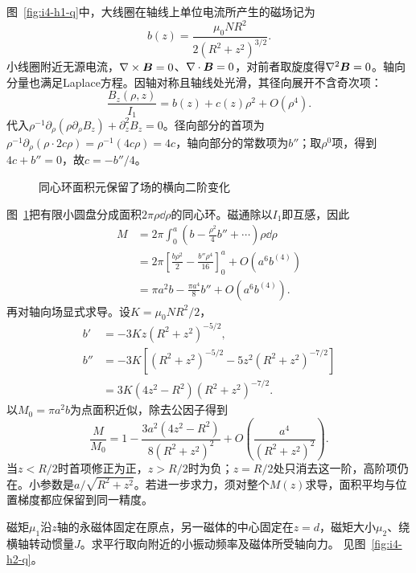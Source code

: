 \begin{solution}
图~\ref{fig:i4-h1-q}中，大线圈在轴线上单位电流所产生的磁场记为
\[
b(z)=\frac{\mu_0NR^2}{2(R^2+z^2)^{3/2}}.
\]
小线圈附近无源电流，$\nabla\times\bm{B}=0$、$\nabla\cdot\bm{B}=0$，对前者取旋度得$\nabla^2\bm{B}=0$。轴向分量也满足Laplace方程。因轴对称且轴线处光滑，其径向展开不含奇次项：
\[
\frac{B_z(\rho,z)}{I_1}=b(z)+c(z)\rho^2+O(\rho^4).
\]
代入$\rho^{-1}\partial_\rho(\rho\partial_\rho B_z)+\partial_z^2B_z=0$。径向部分的首项为$\rho^{-1}\partial_\rho(\rho\cdot2c\rho)=\rho^{-1}(4c\rho)=4c$，轴向部分的常数项为$b''$；取$\rho^0$项，得到$4c+b''=0$，故$c=-b''/4$。
\begin{figure}[H]\centering
{}
\caption{同心环面积元保留了场的横向二阶变化}\label{fig:i4-h1-s}
\end{figure}
图~\ref{fig:i4-h1-s}把有限小圆盘分成面积$2\pi\rho\dd\rho$的同心环。磁通除以$I_1$即互感，因此
\[
\begin{aligned}
M&=2\pi\int_0^a\left(b-\frac{\rho^2}{4}b''+\cdots\right)\rho\dd\rho\\
&=2\pi\left[\frac{b\rho^2}2-\frac{b''\rho^4}{16}\right]_0^a+O(a^6b^{(4)})\\
&=\pi a^2b-\frac{\pi a^4}{8}b''+O(a^6b^{(4)}).
\end{aligned}
\]
再对轴向场显式求导。设$K=\mu_0NR^2/2$，
\[\begin{aligned}
b'&=-3Kz(R^2+z^2)^{-5/2},\\
b''&=-3K\left[(R^2+z^2)^{-5/2}-5z^2(R^2+z^2)^{-7/2}\right]\\
&=3K(4z^2-R^2)(R^2+z^2)^{-7/2}.
\end{aligned}\]
以$M_0=\pi a^2b$为点面积近似，除去公因子得到
\[
\boxed{\frac{M}{M_0}=1-
\frac{3a^2(4z^2-R^2)}{8(R^2+z^2)^2}
+O\!\left(\frac{a^4}{(R^2+z^2)^2}\right)}.
\]
当$z<R/2$时首项修正为正，$z>R/2$时为负；$z=R/2$处只消去这一阶，高阶项仍在。小参数是$a/\sqrt{R^2+z^2}$。若进一步求力，须对整个$M(z)$求导，面积平均与位置梯度都应保留到同一精度。
\end{solution}

\begin{exercise}[轴向偶极场中的转动振动]\label{ex:i4-h2}
磁矩$\mu_1$沿$z$轴的永磁体固定在原点，另一磁体的中心固定在$z=d$，磁矩大小$\mu_2$、绕横轴转动惯量$J$。求平行取向附近的小振动频率及磁体所受轴向力。 见图~\ref{fig:i4-h2-q}。
\end{exercise}

